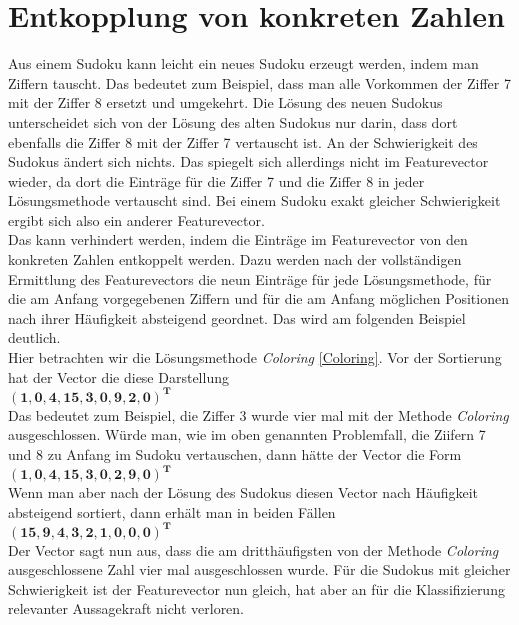 \newpage
\section{Entkopplung von konkreten Zahlen}
Aus einem Sudoku kann leicht ein neues Sudoku erzeugt werden, indem man Ziffern tauscht. Das bedeutet zum Beispiel, dass man alle Vorkommen der Ziffer 7 mit der Ziffer 8 ersetzt und umgekehrt. Die Lösung des neuen Sudokus unterscheidet sich von der Lösung des alten Sudokus nur darin, dass dort ebenfalls die Ziffer 8 mit der Ziffer 7 vertauscht ist. An der Schwierigkeit des Sudokus ändert sich nichts. Das spiegelt sich allerdings nicht im Featurevector wieder, da dort die Einträge für die Ziffer 7 und die Ziffer 8 in jeder Lösungsmethode vertauscht sind. Bei einem Sudoku exakt gleicher Schwierigkeit ergibt sich also ein anderer Featurevector.\\
Das kann verhindert werden, indem die Einträge im Featurevector von den konkreten Zahlen entkoppelt werden. Dazu werden nach der vollständigen Ermittlung des Featurevectors die neun Einträge für jede Lösungsmethode, für die am Anfang vorgegebenen Ziffern und für die am Anfang möglichen Positionen nach ihrer Häufigkeit absteigend geordnet. Das wird am folgenden Beispiel deutlich.\\
Hier betrachten wir die Lösungsmethode \textit{Coloring} \ref{Coloring}. Vor der Sortierung hat der Vector die diese Darstellung \\
$\mathbf{(1, 0, 4, 15, 3, 0, 9, 2, 0)^{T}}$\\
Das bedeutet zum Beispiel, die Ziffer 3 wurde vier mal mit der Methode \textit{Coloring} ausgeschlossen. Würde man, wie im oben genannten Problemfall, die Ziifern 7 und 8 zu Anfang im Sudoku vertauschen, dann hätte der Vector die Form\\
$\mathbf{(1, 0, 4, 15, 3, 0, 2, 9, 0)^{T}}$\\
Wenn man aber nach der Lösung des Sudokus diesen Vector nach Häufigkeit absteigend sortiert, dann erhält man in beiden Fällen\\
$\mathbf{(15, 9, 4, 3, 2, 1, 0, 0, 0)^{T}}$\\
Der Vector sagt nun aus, dass die am dritthäufigsten von der Methode \textit{Coloring} ausgeschlossene Zahl vier mal ausgeschlossen wurde. Für die Sudokus mit gleicher Schwierigkeit ist der Featurevector nun gleich, hat aber an für die Klassifizierung relevanter Aussagekraft nicht verloren.